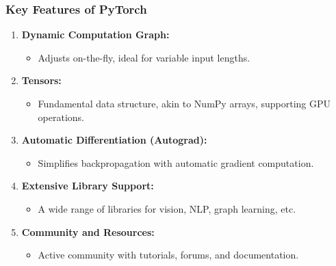 \documentclass[aspectratio=169]{beamer}
\begin{document}
\begin{frame}[fragile]
    \frametitle{Key Features of PyTorch}
    \begin{enumerate}
        \item \textbf{Dynamic Computation Graph:}
        \begin{itemize}
            \item Adjusts on-the-fly, ideal for variable input lengths.
        \end{itemize}
        
        \item \textbf{Tensors:}
        \begin{itemize}
            \item Fundamental data structure, akin to NumPy arrays, supporting GPU operations.
        \end{itemize}
        
        \item \textbf{Automatic Differentiation (Autograd):}
        \begin{itemize}
            \item Simplifies backpropagation with automatic gradient computation.
        \end{itemize}

        \item \textbf{Extensive Library Support:}
        \begin{itemize}
            \item A wide range of libraries for vision, NLP, graph learning, etc.
        \end{itemize}
        
        \item \textbf{Community and Resources:}
        \begin{itemize}
            \item Active community with tutorials, forums, and documentation.
        \end{itemize}
    \end{enumerate}
\end{frame}
\end{document}
